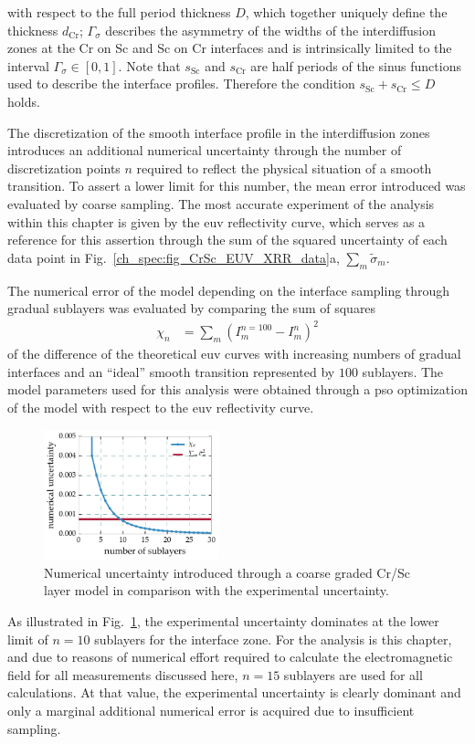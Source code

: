 with respect to the full period thickness $D$, which together uniquely define the thickness $d_\text{Cr}$; $\Gamma_\sigma$ describes the 
asymmetry of the widths of the interdiffusion zones at the Cr on Sc and Sc on Cr 
interfaces and is intrinsically limited to the interval $\Gamma_\sigma \in [0,1]$. Note that 
$s_\text{Sc}$ and $s_\text{Cr}$ are half periods of the sinus functions used to 
describe the interface profiles. Therefore the condition $s_\text{Sc} + 
s_\text{Cr} \leq D$ holds.

The discretization of the smooth interface profile in the interdiffusion zones introduces an additional numerical uncertainty through the number of discretization points $n$ required to reflect the physical situation of a smooth transition. To assert a lower limit for this number, the mean error introduced was evaluated by coarse sampling. The most accurate experiment of the analysis within this chapter is given by the \gls{euv} reflectivity curve, which serves as a reference for this assertion through the sum of the squared uncertainty of each data point in Fig.~\ref{ch_spec:fig_CrSc_EUV_XRR_data}a, $\sum_m \tilde{\sigma}_m$. 

The numerical error of the model depending on the interface sampling through gradual sublayers was evaluated by comparing the sum of squares
\begin{align}
\chi_n &= \sum\limits_m (I^{n=100}_m - I^n_m)^2
\end{align}
of the difference of the theoretical \gls{euv} curves with increasing numbers of gradual interfaces and an ``ideal'' smooth transition represented by $100$ sublayers. The model parameters used for this analysis were obtained through a \gls{pso} optimization of the model with respect to the \gls{euv} reflectivity curve.
\begin{figure}[htbp]
  \centering
  \includegraphics[width=0.45\textwidth]{img/CrSc_numerical_uncertainty_mixlayer}
  \caption{Numerical uncertainty introduced through a coarse graded Cr/Sc layer model in comparison with the experimental uncertainty.}
  \label{ch_spec:fig_CrSc_numerical_uncertainty_mixlayer}
\end{figure}
As illustrated in Fig.~\ref{ch_spec:fig_CrSc_numerical_uncertainty_mixlayer}, the experimental uncertainty dominates at the lower limit of $n=10$ sublayers for the interface zone.
For the analysis is this chapter, and due to reasons of numerical effort required to calculate the electromagnetic field for all measurements discussed here, $n=15$ sublayers are used for all calculations. At that value, the experimental uncertainty is clearly dominant and only a marginal additional numerical error is acquired due to insufficient sampling.

